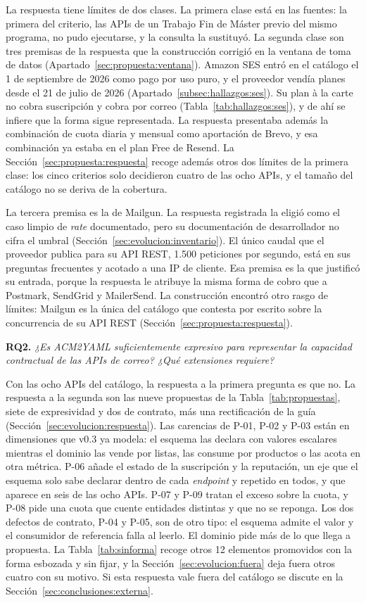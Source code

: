 La respuesta tiene límites de dos clases.
La primera clase está en las fuentes: la primera del criterio, las APIs de un Trabajo Fin de Máster previo del mismo programa, no pudo ejecutarse, y la consulta la sustituyó.
La segunda clase son tres premisas de la respuesta que la construcción corrigió en la ventana de toma de datos (Apartado~\ref{sec:propuesta:ventana}).
Amazon SES entró en el catálogo el 1 de septiembre de 2026 como pago por uso puro, y el proveedor vendía planes desde el 21 de julio de 2026 (Apartado~\ref{subsec:hallazgos:ses}).
Su plan à la carte no cobra suscripción y cobra por correo (Tabla~\ref{tab:hallazgos:ses}), y de ahí se infiere que la forma sigue representada.
La respuesta presentaba además la combinación de cuota diaria y mensual como aportación de Brevo, y esa combinación ya estaba en el plan Free de Resend.
La Sección~\ref{sec:propuesta:respuesta} recoge además otros dos límites de la primera clase: los cinco criterios solo decidieron cuatro de las ocho APIs, y el tamaño del catálogo no se deriva de la cobertura.

La tercera premisa es la de Mailgun.
La respuesta registrada la eligió como el caso limpio de \textit{rate} documentado, pero su documentación de desarrollador no cifra el umbral (Sección~\ref{sec:evolucion:inventario}).
El único caudal que el proveedor publica para su API REST, 1.500 peticiones por segundo, está en sus preguntas frecuentes y acotado a una IP de cliente.
Esa premisa es la que justificó su entrada, porque la respuesta le atribuye la misma forma de cobro que a Postmark, SendGrid y MailerSend.
La construcción encontró otro rasgo de límites: Mailgun es la única del catálogo que contesta por escrito sobre la concurrencia de su API REST (Sección~\ref{sec:propuesta:respuesta}).

\noindent\textbf{RQ2.} \emph{¿Es ACM2YAML suficientemente expresivo para representar la capacidad contractual de las APIs de correo? ¿Qué extensiones requiere?}

Con las ocho APIs del catálogo, la respuesta a la primera pregunta es que no.
La respuesta a la segunda son las nueve propuestas de la Tabla~\ref{tab:propuestas}, siete de expresividad y dos de contrato, más una rectificación de la guía (Sección~\ref{sec:evolucion:respuesta}).
Las carencias de P-01, P-02 y P-03 están en dimensiones que v0.3 ya modela: el esquema las declara con valores escalares mientras el dominio las vende por listas, las consume por productos o las acota en otra métrica.
P-06 añade el estado de la suscripción y la reputación, un eje que el esquema solo sabe declarar dentro de cada \textit{endpoint} y repetido en todos, y que aparece en seis de las ocho APIs.
P-07 y P-09 tratan el exceso sobre la cuota, y P-08 pide una cuota que cuente entidades distintas y que no se reponga.
Los dos defectos de contrato, P-04 y P-05, son de otro tipo: el esquema admite el valor y el consumidor de referencia falla al leerlo.
El dominio pide más de lo que llega a propuesta.
La Tabla~\ref{tab:sinforma} recoge otros 12 elementos promovidos con la forma esbozada y sin fijar, y la Sección~\ref{sec:evolucion:fuera} deja fuera otros cuatro con su motivo.
Si esta respuesta vale fuera del catálogo se discute en la Sección~\ref{sec:conclusiones:externa}.

